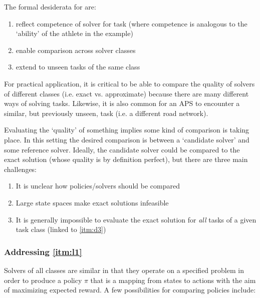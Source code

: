     The formal desiderata for \xQ{} are:
    
    \begin{enumerate}[label=\textbf{D\arabic*}]
        \item reflect competence of solver \solve{} for task \task{} (where competence is analogous to the `ability' of the athlete in the example)\label{itm:d1}
        \item enable comparison across solver classes \label{itm:d2}
        \item extend to unseen tasks of the same class \taskclass \label{itm:d3}
    \end{enumerate}
    
    For practical application, it is critical to be able to compare the quality of solvers of different classes (i.e. exact vs. approximate) because there are many different ways of solving tasks. Likewise, it is also common for an APS to encounter a similar, but previously unseen, task (i.e. a different road network).
    
    Evaluating the `quality' of something implies some kind of comparison is taking place. In this setting the desired comparison is between a `candidate solver' \solve{} and some reference solver. Ideally, the candidate solver could be compared to the exact solution (whose quality is by definition perfect), but there are three main challenges:

    \begin{enumerate}[label=\textbf{C\arabic*}]
        \item It is unclear how policies/solvers should be compared \label{itm:l1}
        \item Large state spaces make exact solutions infeasible \label{itm:l2}
        \item It is generally impossible to evaluate the exact solution for \emph{all} tasks of a given task class \taskclass{} (linked to \ref{itm:d3}) \label{itm:l3}
    \end{enumerate}

    \subsubsection{Addressing \ref{itm:l1}} \label{sec:compare_policies}
        Solvers of all classes are similar in that they operate on a specified problem in order to produce a policy $\pi$ that is a mapping from states to actions with the aim of maximizing expected reward. A few possibilities for comparing policies include:
    

